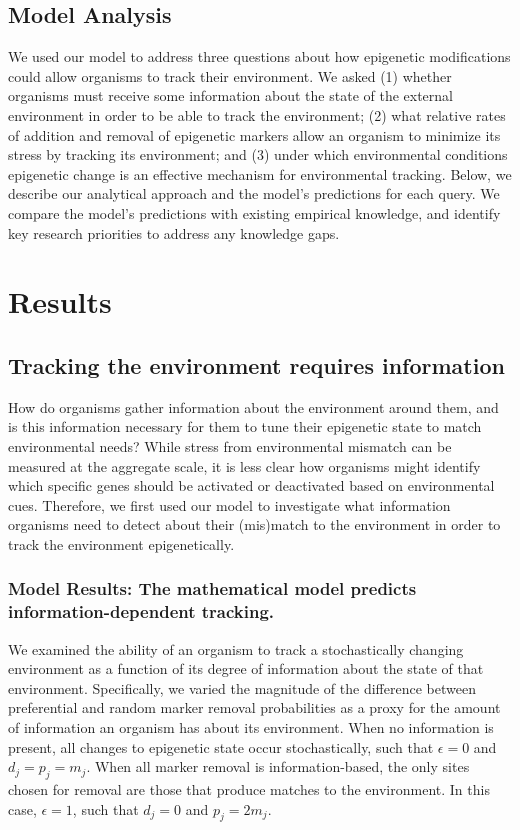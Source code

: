 \documentclass{article}
\begin{document}
\subsection{Model Analysis}
We used our model to address three questions about how epigenetic modifications could allow organisms to track their environment. We asked (1) whether organisms must receive some information about the state of the external environment in order to be able to track the environment; (2) what relative rates of addition and removal of epigenetic markers allow an organism to minimize its stress by tracking its environment; and (3) under which environmental conditions epigenetic change is an effective mechanism for environmental tracking. Below, we describe our analytical approach and the model's predictions for each query. We compare the model's predictions with existing empirical knowledge, and identify key research priorities to address any knowledge gaps.





\clearpage

\section{Results}

\subsection{Tracking the environment requires information}
How do organisms gather information about the environment around them, and is this information necessary for them to tune their epigenetic state to match environmental needs? While stress from environmental mismatch can be measured at the aggregate scale, it is less clear how organisms might identify which specific genes should be activated or deactivated based on environmental cues. Therefore, we first used our model to investigate what information organisms need to detect about their (mis)match to the environment in order to track the environment epigenetically.


\subsubsection{Model Results: The mathematical model predicts information-dependent tracking.}
We examined the ability of an organism to track a stochastically changing environment as a function of its degree of information about the state of that environment. Specifically, we varied the magnitude of the difference between preferential and random marker removal probabilities as a proxy for the amount of information an organism has about its environment. When no information is present, all changes to epigenetic state occur stochastically, such that $\epsilon = 0$ and $d_j = p_j = m_j$. When all marker removal is information-based, the only sites chosen for removal are those that produce matches to the environment. In this case, $\epsilon = 1$, such that $d_j = 0$ and $p_j = 2m_j$. 
\end{document}
